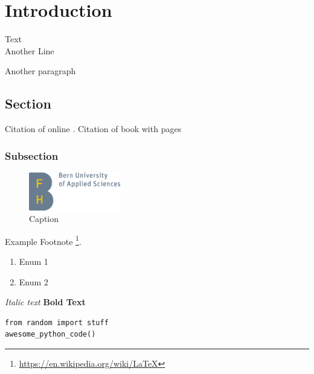 \chapter{Introduction}
Text\\
Another Line

Another paragraph

\section{Section}
Citation of online \cite{examplewiki}.
Citation of book with pages \cite{examplecitation}

\subsection{Subsection}

\begin{figure}[hbt!]
  \begin{center}
    \captionsetup{justification=centering}
    \includegraphics[width=4cm]{src/img/logo_bfh_en.png}
    \caption{Caption}
    \label{fig:figurereferencename}
  \end{center}
\end{figure}

Example Footnote \footnote{\url{https://en.wikipedia.org/wiki/LaTeX}}.

\begin{enumerate}
  \item Enum 1
  \item Enum 2
\end{enumerate}

\textit{Italic text}
\textbf{Bold Text}

\lstset{language=Python}
\begin{lstlisting}
from random import stuff
awesome_python_code()
\end{lstlisting}
